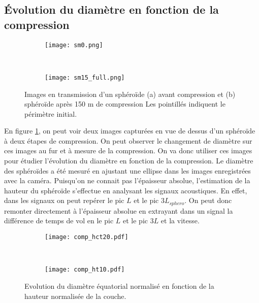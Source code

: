 \subsection{Évolution du diamètre en fonction de la compression}
\begin{figure}[ht!]
\centering
\begin{subfigure}[t]{0.45\textwidth}
	\texttt{[image: sm0.png]}
	\caption{}
\end{subfigure}
~~
\begin{subfigure}[t]{0.45\textwidth}
	\texttt{[image: sm15\_full.png]}
	\caption{}
\end{subfigure}
\caption{Images en transmission d'un sphéroïde (a) avant compression et (b) sphéroïde après 150 \textmu m de compression Les pointillés indiquent le périmètre initial.\label{compression_pictures}}
\end{figure}
En figure \ref{compression_pictures}, on peut voir deux images capturées en vue de dessus d'un sphéroïde à deux étapes de compression. On peut observer le changement de diamètre  sur ces images au fur et à mesure de la compression. On va donc utiliser ces images pour étudier l'évolution du diamètre en fonction de la compression.
Le diamètre des sphéroïdes a été mesuré en ajustant une ellipse dans les images enregistrées avec la caméra. Puisqu'on ne connait pas l'épaisseur absolue, l'estimation de la hauteur du sphéroïde s'effectue en analysant les signaux acoustiques. En effet, dans les signaux on peut repérer le pic $L$ et le pic $3L_{sphero}$. On peut donc remonter directement à l'épaisseur absolue en extrayant dans un signal la différence de temps de vol en le pic $L$ et le pic $3L$ et la vitesse.
\begin{figure}[ht!]
\begin{subfigure}[t]{0.49\textwidth}
	\texttt{[image: comp\_hct20.pdf]}
	\caption{\label{compression_diameter_hct}}
\end{subfigure}
~~
\begin{subfigure}[t]{0.49\textwidth}
	\texttt{[image: comp\_ht10.pdf]}
	\caption{\label{compression_diameter_ht}}
\end{subfigure}
\caption{Evolution du diamètre équatorial normalisé en fonction de la hauteur normalisée de la couche.}
\end{figure}

